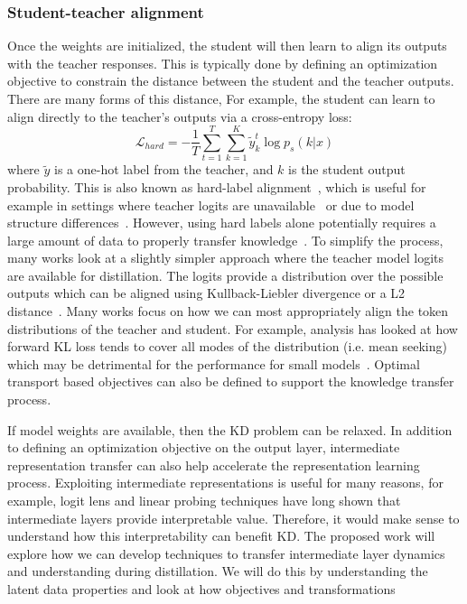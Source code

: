 \subsubsection{Student-teacher alignment}
Once the weights are initialized, the student will then learn to align its outputs with the teacher responses. This is typically done by defining an optimization objective to constrain the distance between the student and the teacher outputs. There are many forms of this distance, For example, the student can learn to align directly to the teacher's outputs via a cross-entropy loss:
\[
\mathcal{L}_{hard} = -\frac{1}{T}\sum_{t=1}^T \sum_{k=1}^K \tilde{y}^t_k \log p_s(k | x)
\]
where $\tilde{y}$ is a one-hot label from the teacher, and $k$ is the student output probability. This is also known as hard-label alignment~\cite{hinton2015distilling}, which is useful for example in settings where teacher logits are unavailable~\cite{wang2023self, taori2023stanford} or due to model structure differences~\cite{kim2016sequence}. However, using hard labels alone potentially requires a large amount of data to properly transfer knowledge~\cite{gudibande2023false}. To simplify the process, many works look at a slightly simpler approach where the teacher model logits are available for distillation. The logits provide a distribution over the possible outputs which can be aligned using Kullback-Liebler divergence or a L2 distance~\cite{ba2014deepnets}.
Many works focus on how we can most appropriately align the token distributions of the teacher and student. For example, analysis has looked at how forward KL loss tends to cover all modes of the distribution (i.e. mean seeking) which may be detrimental for the performance for small models~\cite{huszar2015not, gu2024minillm}.  Optimal transport based objectives can also be defined to support the knowledge transfer process.


If model weights are available, then the KD problem can be relaxed.  In addition to defining an optimization objective on the output layer, intermediate representation transfer can also help accelerate the representation learning process. Exploiting intermediate representations is useful for many reasons, for example, logit lens and linear probing techniques have long shown that intermediate layers provide interpretable value. Therefore, it would make sense to understand how this interpretability can benefit KD. The proposed work will explore how we can develop techniques to transfer intermediate layer dynamics and understanding during distillation. We will do this by understanding the latent data properties and look at how objectives and transformations 

